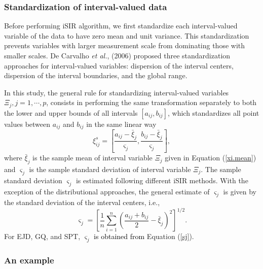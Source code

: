 \documentclass[article]{jss}
\begin{document}
\subsubsection{Standardization of interval-valued data}
Before performing iSIR algorithm, we first standardize each
interval-valued variable of the data to have zero mean and unit
variance. This standardization prevents variables with
larger measurement scale from dominating those with
smaller scales. De Carvalho {\it et al.}, (2006) proposed
three standardization approaches for interval-valued
variables:  dispersion of the interval
centers, dispersion of the interval
boundaries, and the global range.

In this study, the general rule for standardizing
interval-valued variables $\Xi_j, j=1,\cdots, p$, consists in
performing the same transformation separately to both the lower
and upper bounds of all intervals $[a_{ij}, b_{ij}]$, which 
standardizes all point values between $a_{ij}$ and $b_{ij}$ 
in the same linear way
\[
\xi_{ij}^s = \left[\frac{a_{ij}-\bar{\xi}_j}{\varsigma_j},
 \frac{b_{ij}-\bar{\xi}_j}{\varsigma_j}\right],
\]
where $\bar{\xi}_{j}$ is the sample mean of interval
variable $\Xi_j$ given in Equation (\ref{xi.mean}) and
$\varsigma_j$ is the sample standard deviation of interval
variable $\Xi_j$. The sample standard deviation
$\varsigma_j$ is estimated following different iSIR
methods. With the exception of the distributional approaches, the general estimate of
$\varsigma_j$ is given by the standard deviation of the 
interval centers, i.e.,
\[
 \varsigma_j=\left[\frac{1}{n}\sum_{i=1}^n\left(\frac{a_{ij}+b_{ij}}{2}-
\bar{\xi}_j\right)^2\right]^{1/2}.
\]
For EJD, GQ, and SPT,
$\varsigma_j$  
\textcolor{black}{is obtained from}
Equation (\ref{sj}). 


\subsubsection{An example}
\end{document}
